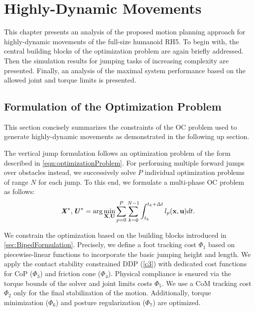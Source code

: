 
\chapter{Highly-Dynamic Movements}\label{c5}
This chapter presents an analysis of the proposed motion planning approach for highly-dynamic movements of the full-size humanoid RH5. To begin with, the central building blocks of the optimization problem are again briefly addressed. Then the simulation results for jumping tasks of increasing complexity are presented. Finally, an analysis of the maximal system performance based on the allowed joint and torque limits is presented.  


\section{Formulation of the Optimization Problem}
This section concisely summarizes the constraints of the \gls{OC} problem used to generate highly-dynamic movements as demonstrated in the following up section. 

The vertical jump formulation follows an optimization problem of the form described in \cref{eqn:optimizationProblem}. For performing multiple forward jumps over obstacles instead, we successively solve $P$ individual optimization problems of range $N$ for each jump. To this end, we formulate a multi-phase \gls{OC} problem as follows: 
\begin{equation}\label{eqn:optimizationProblemSequence}
\bm{\mathit{X}}^*,\bm{\mathit{U}}^*= 
\arg\min_{\mathbf{X},\mathbf{U}} \sum_{p=0}^{P}
\sum_{k=0}^{N-1} \int_{t_k}^{t_k+\Delta t} l_p(\mathbf{x},\mathbf{u})dt. 
\end{equation} 

We constrain the optimization based on the building blocks introduced in \cref{sec:BipedFormulation}. Precisely, we define a foot tracking cost $\Phi_1$ based on piecewise-linear functions to incorporate the basic jumping height and length. We apply the contact stability constrained \gls{DDP} (\cref{c3}) with dedicated cost functions for \gls{CoP} ($\Phi_3$) and friction cone ($\Phi_4$). Physical compliance is ensured via the torque bounds of the solver and joint limits costs $\Phi_5$. We use a \gls{CoM} tracking cost $\Phi_2$ only for the final stabilization of the motion. Additionally, torque minimization ($\Phi_6$) and posture regularization ($\Phi_7$) are optimized.


